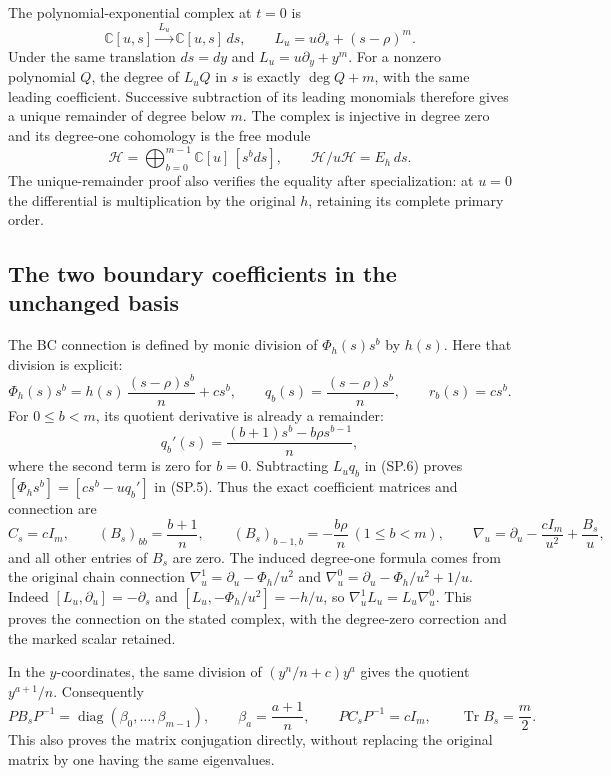 The polynomial-exponential complex at \(t=0\) is
\[
 \mathbb C[u,s]\xrightarrow{\,L_u\,}
 \mathbb C[u,s]\,ds,\qquad
 L_u=u\partial_s+(s-\rho)^m .
 \tag{SP.4}\label{CFStage:eq:sp-complex}
\]
Under the same translation \(ds=dy\) and \(L_u=u\partial_y+y^m\).
For a nonzero polynomial \(Q\), the degree of \(L_uQ\) in \(s\)
is exactly \(\deg Q+m\), with the same leading coefficient.
Successive subtraction of its leading monomials therefore gives
a unique remainder of degree below \(m\). The complex is injective
in degree zero and its degree-one cohomology is the free module
\[
 \mathcal H=\bigoplus_{b=0}^{m-1}\mathbb C[u]\,[s^bds],
 \qquad
 \mathcal H/u\mathcal H=E_h\,ds .
 \tag{SP.5}\label{CFStage:eq:sp-lattice}
\]
The unique-remainder proof also verifies the equality after
specialization: at \(u=0\) the differential is multiplication
by the original \(h\), retaining its complete primary order.

\subsection{The two boundary coefficients in the unchanged basis}

The BC connection is defined by monic division of
\(\Phi_h(s)s^b\) by \(h(s)\). Here that division is explicit:
\[
 \Phi_h(s)s^b
   =h(s)\,\frac{(s-\rho)s^b}{n}+cs^b,\qquad
 q_b(s)=\frac{(s-\rho)s^b}{n},\qquad r_b(s)=cs^b .
 \tag{SP.6}\label{CFStage:eq:sp-division}
\]
For \(0\le b<m\), its quotient derivative is already a remainder:
\[
 q_b'(s)=\frac{(b+1)s^b-b\rho s^{b-1}}{n},
 \tag{SP.7}\label{CFStage:eq:sp-Bcolumn}
\]
where the second term is zero for \(b=0\).
Subtracting \(L_uq_b\) in (SP.6) proves
\([\Phi_hs^b]=[cs^b-uq_b']\) in (SP.5).
Thus the exact coefficient matrices and connection are
\[
 C_s=cI_m,\qquad
 (B_s)_{bb}=\frac{b+1}{n},\qquad
 (B_s)_{b-1,b}=-\frac{b\rho}{n}\ (1\le b<m),\qquad
 \nabla_u=\partial_u-\frac{cI_m}{u^2}+\frac{B_s}{u},
 \tag{SP.8}\label{CFStage:eq:sp-connection}
\]
and all other entries of \(B_s\) are zero.
The induced degree-one formula comes from the original chain
connection
\(\nabla_u^1=\partial_u-\Phi_h/u^2\) and
\(\nabla_u^0=\partial_u-\Phi_h/u^2+1/u\).
Indeed
\([L_u,\partial_u]=-\partial_s\) and
\([L_u,-\Phi_h/u^2]=-h/u\), so
\(\nabla_u^1L_u=L_u\nabla_u^0\).
This proves the connection on the stated complex, with the
degree-zero correction and the marked scalar retained.

In the \(y\)-coordinates, the same division of
\((y^n/n+c)y^a\) gives the quotient \(y^{a+1}/n\).
Consequently
\[
 PB_sP^{-1}=\operatorname{diag}(\beta_0,\ldots,\beta_{m-1}),
 \qquad \beta_a=\frac{a+1}{n},\qquad
 PC_sP^{-1}=cI_m,\qquad \operatorname{Tr}B_s=\frac m2.
 \tag{SP.9}\label{CFStage:eq:sp-diagonal}
\]
This also proves the matrix conjugation directly, without replacing
the original matrix by one having the same eigenvalues.


